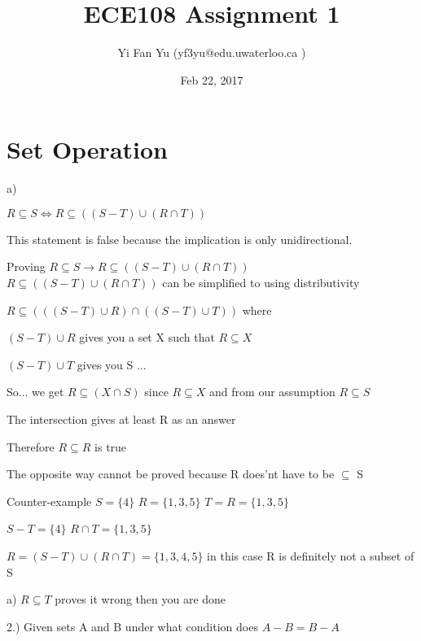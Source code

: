 \documentclass[a4paper,12pt]{article}
\begin{document}
\title{ECE108 Assignment 1}
\author{Yi Fan Yu (yf3yu@edu.uwaterloo.ca ) }
\date{Feb 22, 2017}
\maketitle


\section{Set Operation}


a)
\begin{flushleft}

$R \subseteq  S \iff R \subseteq  ((S - T) \cup (R \cap T))$ 


This statement is false because the implication is only unidirectional. 
\bigskip



Proving $R \subseteq  S \rightarrow R \subseteq  ((S - T) \cup (R \cap T)) $ \\ 



$R \subseteq  ((S - T) \cup (R \cap T))$ can be simplified to using distributivity
\bigskip

$R \subseteq ( (( S - T )\cup R )\cap( ( S - T )\cup T) ) $ where


$( S - T )\cup R$ gives you a set X such that $R \subseteq X$

$ ( S - T )\cup T$  gives you S ...
\bigskip

	So... we get $ R \subseteq  (X \cap S) $ 
since $R \subseteq X$ and from our assumption $R \subseteq S$

The intersection gives at least R as an answer

Therefore
$R \subseteq  R$ is true 
 
\bigskip
The opposite way cannot be proved because R does'nt have to be  $\subseteq$ S

Counter-example $ S = \{4\}$
$R = \{1,3,5\}$
$T = R = \{1,3,5\}$

$S-T = \{4\}$
$R \cap T = \{1,3,5\}$

$ R = (S - T) \cup (R \cap T) = \{1,3,4,5\}$ 
in this case R is definitely not a subset of S



\end{flushleft}



a) $R \subseteq  T$ proves it wrong then you are done

2.) Given sets A and B under what condition does $A-B= B-A$ 
\end{document}

